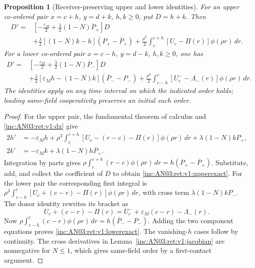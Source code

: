 \documentclass[11pt]{article}
\numberwithin{equation}{section}
\newtheorem{proposition}[theorem]{Proposition}
\theoremstyle{remark}\newtheorem{remark}[theorem]{Remark}
\newcommand{\dd}{\,d}
\newcommand{\1}{\mathbf 1}
\begin{document}
\begin{proposition}[Receiver-preserving upper and lower identities]
\label{inc:AN03:ret:v1:averagedpair}
For an upper co-ordered pair $x=c+h$, $y=d+k$, $h,k\ge0$, put $D=h+k$.
Then
\begin{align}
 D'={}&\left[-\frac{\varepsilon_M}{2}
       +\frac\lambda2(1-N)\overline P_+\right]D\nonumber\\
 &+\frac\lambda2[(1-N)k-h](P_+-\overline P_+)
 +\frac{\rho^3}{2}\int_c^{c+h}[U_c-\Pi(r)]\phi(\rho r)\dd r.
 \label{inc:AN03:ret:v1:upperexact}
\end{align}
For a lower co-ordered pair $x=c-h$, $y=d-k$, $h,k\ge0$, one has
\begin{align}
 D'={}&\left[-\frac{\varepsilon_M}{2}
       +\frac\lambda2(1-N)\overline P_-\right]D\nonumber\\
 &+\frac\lambda2[\varepsilon_M h-(1-N)k]
       (\overline P_--P_-)
 +\frac{\rho^3}{2}\int_{c-h}^{c}[U_c^--\Lambda_-(r)]\phi(\rho r)\dd r.
 \label{inc:AN03:ret:v1:lowerexact}
\end{align}
The identities apply on any time interval on which the indicated order
holds; leading same-field cooperativity preserves an initial such order.
\end{proposition}
\begin{proof}
For the upper pair, the fundamental theorem of calculus and
\eqref{inc:AN03:ret:v1:dx} give
\begin{align*}
 2h'&=-\varepsilon_Mh+
 \rho^3\int_c^{c+h}[U_c-(r-c)-\Pi(r)]\phi(\rho r)\dd r
 +\lambda(1-N)kP_+,\\
 2k'&=-\varepsilon_Mk+\lambda(1-N)h\overline P_+.
\end{align*}
Integration by parts gives
$\rho\int_c^{c+h}(r-c)\phi(\rho r)\dd r
=h(P_+-\overline P_+)$.
Substitute, add, and collect the coefficient of $D$ to obtain
\eqref{inc:AN03:ret:v1:upperexact}.
For the lower pair the corresponding first integral is
$\rho^3\int_{c-h}^{c}[U_c+(c-r)-\Pi(r)]\phi(\rho r)\dd r$,
with cross term $\lambda(1-N)kP_-$. The donor identity rewrites its
bracket as
\[
 U_c+(c-r)-\Pi(r)=U_c^-+\varepsilon_M(c-r)-\Lambda_-(r).
\]
Now
$\rho\int_{c-h}^{c}(c-r)\phi(\rho r)\dd r
=h(\overline P_--P_-)$.
Adding the two component equations proves
\eqref{inc:AN03:ret:v1:lowerexact}.
The vanishing-$h$ cases follow by continuity. The cross derivatives in
Lemma~\ref{inc:AN03:ret:v1:jacobian} are nonnegative for $N\le1$,
which gives same-field order by a first-contact argument.
\end{proof}
\end{document}
